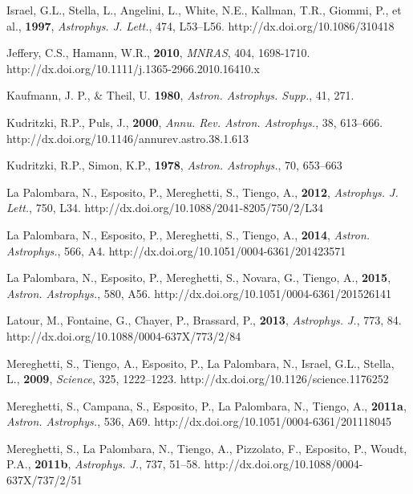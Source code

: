 \documentclass[USenglish,twocolumn]{article}
\begin{document}
\begin{thebibliography}{}
Israel, G.L., Stella, L., Angelini, L., White, N.E., Kallman, T.R., Giommi, P., et al., \textbf{1997}, \textit{Astrophys. J. Lett.}, 474, L53–L56. http://dx.doi.org/10.1086/310418

Jeffery, C.S., Hamann, W.R., \textbf{2010}, \textit{MNRAS}, 404, 1698-1710. http://dx.doi.org/10.1111/j.1365-2966.2010.16410.x

Kaufmann, J. P., \& Theil, U. \textbf{1980}, \textit{Astron. Astrophys. Supp.}, 41, 271.

Kudritzki, R.P., Puls, J., \textbf{2000}, \textit{Annu. Rev. Astron. Astrophys.}, 38, 613–666. http://dx.doi.org/10.1146/annurev.astro.38.1.613

Kudritzki, R.P., Simon, K.P., \textbf{1978}, \textit{Astron. Astrophys.}, 70, 653–663 

La Palombara, N., Esposito, P., Mereghetti, S., Tiengo, A., \textbf{2012}, \textit{Astrophys. J. Lett.}, 750, L34. http://dx.doi.org/10.1088/2041-8205/750/2/L34

La Palombara, N., Esposito, P., Mereghetti, S., Tiengo, A., \textbf{2014}, \textit{Astron. Astrophys.}, 566, A4. http://dx.doi.org/10.1051/0004-6361/201423571

La Palombara, N., Esposito, P., Mereghetti, S., Novara, G., Tiengo, A., \textbf{2015}, \textit{Astron. Astrophys.}, 580, A56. http://dx.doi.org/10.1051/0004-6361/201526141

Latour, M., Fontaine, G., Chayer, P., Brassard, P., \textbf{2013}, \textit{Astrophys. J.}, 773, 84. http://dx.doi.org/10.1088/0004-637X/773/2/84

Mereghetti, S., Tiengo, A., Esposito, P., La Palombara, N., Israel, G.L., Stella, L., \textbf{2009}, \textit{Science}, 325, 1222–1223. http://dx.doi.org/10.1126/science.1176252

Mereghetti, S., Campana, S., Esposito, P., La Palombara, N., Tiengo, A., \textbf{2011a}, \textit{Astron. Astrophys.}, 536, A69. http://dx.doi.org/10.1051/0004-6361/201118045

Mereghetti, S., La Palombara, N., Tiengo, A., Pizzolato, F., Esposito, P., Woudt, P.A., \textbf{2011b}, \textit{Astrophys. J.}, 737, 51–58. http://dx.doi.org/10.1088/0004-637X/737/2/51


\end{thebibliography}
\end{document}
